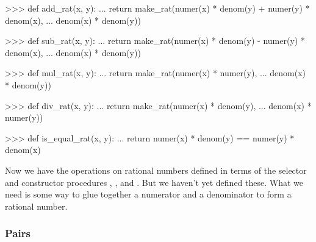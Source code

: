 \begin{codeBlock}
>>> def add_rat(x, y):
...     return make_rat(numer(x) * denom(y) + numer(y) * denom(x),
...                     denom(x) * denom(y))

>>> def sub_rat(x, y):
...     return make_rat(numer(x) * denom(y) - numer(y) * denom(x),
...                     denom(x) * denom(y))

>>> def mul_rat(x, y):
...     return make_rat(numer(x) * numer(y),
...                     denom(x) * denom(y))

>>> def div_rat(x, y):
...     return make_rat(numer(x) * denom(y),
...                     denom(x) * numer(y))

>>> def is_equal_rat(x, y):
...     return numer(x) * denom(y) == numer(y) * denom(x)
\end{codeBlock}

Now we have the operations on rational numbers defined in terms of the selector
and constructor procedures , , and .
But we haven't yet defined these.  What we need is some way to glue together a
numerator and a denominator to form a rational number.

\subsubsection*{Pairs}

